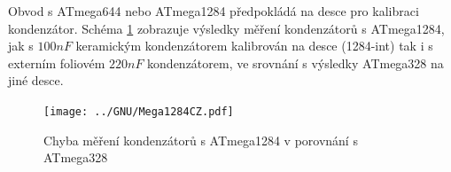 Obvod s ATmega644 nebo ATmega1284 předpokládá na desce pro kalibraci kondenzátor.
Schéma \ref{fig:Mega1284} zobrazuje výsledky měření kondenzátorů s ATmega1284,
jak s \(100nF\)  keramickým kondenzátorem kalibrován na desce (1284-int) tak i s externím
foliovém \(220nF\) kondenzátorem,
ve srovnání s výsledky ATmega328 na jiné desce.

\begin{figure}[H]
\centering
\texttt{[image: ../GNU/Mega1284CZ.pdf]}
\caption{Chyba měření kondenzátorů s ATmega1284 v porovnání s ATmega328}
\label{fig:Mega1284}
\end{figure}
